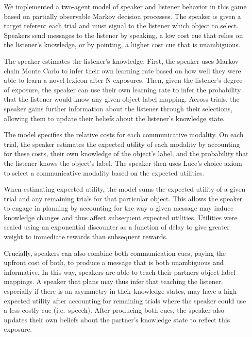 \documentclass[10pt, letterpaper]{article}
\begin{document}
We implemented a two-agent model of speaker and listener behavior in
this game based on partially observable Markov decision processes. The
speaker is given a target referent each trial and must signal to the
listener which object to select. Speakers send messages to the listener
by speaking, a low cost cue that relies on the listener's knowledge, or
by pointing, a higher cost cue that is unambiguous.

The speaker estimates the listener's knowledge. First, the speaker uses
Markov chain Monte Carlo to infer their own learning rate based on how
well they were able to learn a novel lexicon after N exposures. Then,
given the listener's degree of exposure, the speaker can use their own
learning rate to infer the probability that the listener would know any
given object-label mapping. Across trials, the speaker gains further
information about the listener through their selections, allowing them
to update their beliefs about the listener's knowledge state.

The model specifies the relative costs for each communicative modality.
On each trial, the speaker estimates the expected utility of each
modality by accounting for these costs, their own knowledge of the
object's label, and the probability that the listener knows the object's
label. The speaker then uses Luce's choice axiom to select a
communicative modality based on the expected utilities.

When estimating expected utility, the model sums the expected utility of
a given trial and any remaining trials for that particular object. This
allows the speaker to engage in planning by accounting for the way a
given message may induce knowledge changes and thus affect subsequent
expected utilities. Utilities were scaled using an exponential
discounter as a function of delay to give greater weight to immediate
rewards than subsequent rewards.

Crucially, speakers can also combine both communication cues, paying the
upfront cost of both, to produce a message that is both unambiguous and
informative. In this way, speakers are able to teach their partners
object-label mappings. A speaker that plans may thus infer that teaching
the listener, especially if there is an asymmetry in their knowledge
states, may have a high expected utility after accounting for remaining
trials where the speaker could use a less costly cue (i.e.~speech).
After producing both cues, the speaker also updates their own beliefs
about the partner's knowledge state to reflect this exposure.
\end{document}

